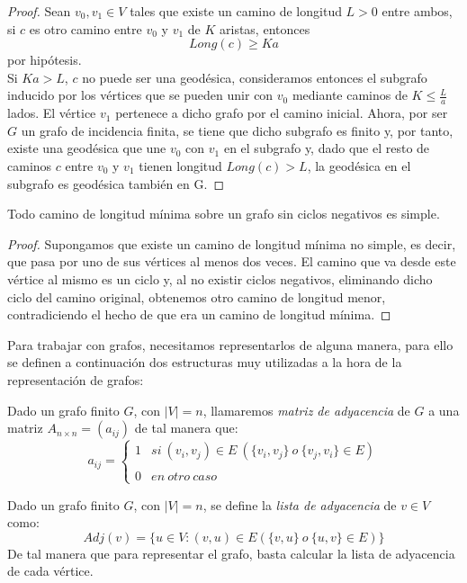 \begin{proof}
	Sean $v_0,v_1\in V$ tales que existe un camino de longitud $L>0$ entre ambos, si $c$ es otro camino entre $v_0$ y $v_1$ de $K$ aristas, entonces
	$$Long(c) \geq Ka$$
	por hipótesis.\\
	Si $Ka>L$, $c$ no puede ser una geodésica, consideramos entonces el subgrafo inducido por los vértices que se pueden unir con $v_0$ mediante caminos de $K\leq \frac{L}{a}$ lados. El vértice $v_1$ pertenece a dicho grafo por el camino inicial. Ahora, por ser $G$ un grafo de incidencia finita, se tiene que dicho subgrafo es finito y, por tanto, existe una geodésica que une $v_0$ con $v_1$ en el subgrafo y, dado que el resto de caminos $c$ entre $v_0$ y $v_1$ tienen longitud $Long(c) > L$, la geodésica en el subgrafo es geodésica también en G.
\end{proof}

\begin{proposicion}
	Todo camino de longitud mínima sobre un grafo sin ciclos negativos es simple.
\end{proposicion}

\begin{proof}
	Supongamos que existe un camino de longitud mínima no simple, es decir, que pasa por uno de sus vértices al menos dos veces. El camino que va desde este vértice al mismo es un ciclo y, al no existir ciclos negativos, eliminando dicho ciclo del camino original, obtenemos otro camino de longitud menor, contradiciendo el hecho de que era un camino de longitud mínima.
\end{proof}

Para trabajar con grafos, necesitamos representarlos de alguna manera, para ello se definen a continuación dos estructuras muy utilizadas a la hora de la representación de grafos:

\begin{definicion}
	Dado un grafo finito $G$, con $|V|=n$, llamaremos \textit{matriz de adyacencia} de $G$ a una matriz $A_{n\times n}=(a_{ij})$ de tal manera que:
	$$a_{ij}= \left\{ \begin{array}{lcc}
		1 &   si\ (v_i,v_j)\in E\ (\{v_i,v_j\}\ o\ \{v_j,v_i\}\in E) \\
		\\ 0 &  en\ otro\ caso
	\end{array}
	\right.$$
\end{definicion}

\begin{definicion}
	Dado un grafo finito $G$, con $|V|=n$, se define la \textit{lista de adyacencia} de $v \in V$ como:
	$$Adj(v) = \{u \in V : (v,u)\in E (\{v,u\}\ o\ \{u,v\}\in E)\}$$
	De tal manera que para representar el grafo, basta calcular la lista de adyacencia de cada vértice.
\end{definicion}

